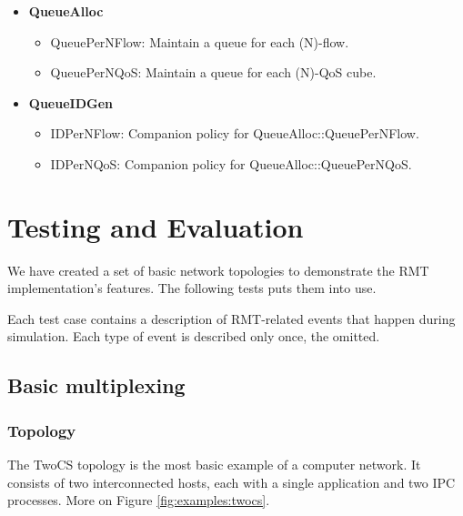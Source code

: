         \begin{itemize}
            \item \textbf{QueueAlloc}
            \begin{itemize}
                \item QueuePerNFlow: Maintain a queue for each (N)-flow.
                \item QueuePerNQoS: Maintain a queue for each (N)-QoS cube.
            \end{itemize}
            \item \textbf{QueueIDGen}
            \begin{itemize}
                \item IDPerNFlow: Companion policy for QueueAlloc::QueuePerNFlow.
                \item IDPerNQoS: Companion policy for QueueAlloc::QueuePerNQoS.
            \end{itemize}
        \end{itemize}


\chapter{Testing and Evaluation}\label{testing}

    We have created a set of basic network topologies to demonstrate the RMT implementation's features. The following tests puts them into use.

    Each test case contains a description of RMT-related events that happen during simulation. Each type of event is described only once, the omitted.

    \section{Basic multiplexing}

        \subsection{Topology}

            The TwoCS topology is the most basic example of a computer network. It consists of two interconnected hosts, each with a single application and two IPC processes. More on Figure \ref{fig:examples:twocs}.


